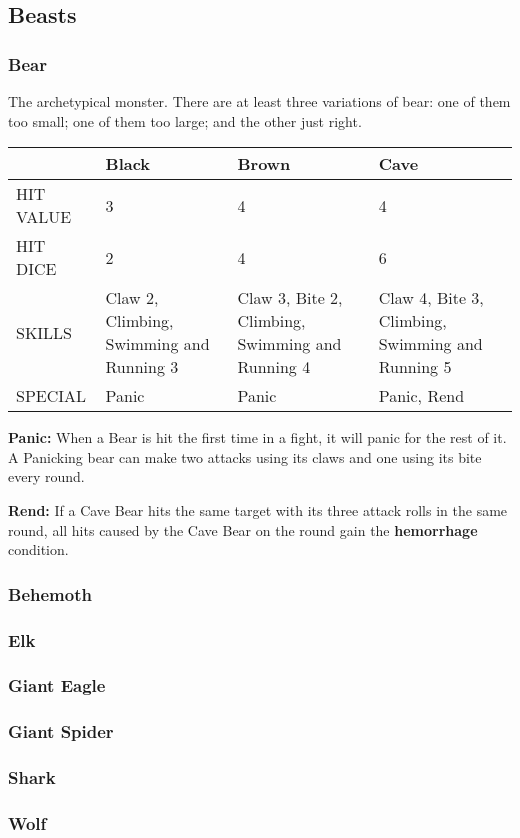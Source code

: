 \subsection{Beasts}
\begin{multicols}{2}
    \subsubsection*{Bear}\label{foe:bear}
    The archetypical monster. There are at least three variations of bear: one of them too small; one of them too large; and the other just right.
    \begin{tabularx}{\columnwidth}{|X|X|X|X|}
        \hline
        & Black & Brown & Cave \\
        \hline
        HIT VALUE & 3 & 4 & 4 \\
        \hline
        HIT DICE & 2 & 4 & 6 \\
        \hline
        SKILLS & Claw 2, Climbing, Swimming and Running 3 & Claw 3, Bite 2, Climbing, Swimming and Running 4 & Claw 4, Bite 3, Climbing, Swimming and Running 5 \\
        \hline
        SPECIAL & Panic & Panic & Panic, Rend \\
        \hline
    \end{tabularx}

    \textbf{Panic:} When a Bear is hit the first time in a fight, it will panic for the rest of it. A Panicking bear can make two attacks using its claws and one using its bite every round.
    
    \textbf{Rend:} If a Cave Bear hits the same target with its three attack rolls in the same round, all hits caused by the Cave Bear on the round gain the \textbf{hemorrhage} condition.
    \subsubsection*{Behemoth}\label{foe:behemoth}
    \subsubsection*{Elk}\label{foe:elk}
    \subsubsection*{Giant Eagle}\label{foe:giant-eagle}
    \subsubsection*{Giant Spider}\label{foe:giant-spider}
    \subsubsection*{Shark}\label{foe:shark}
    \subsubsection*{Wolf}\label{foe:wolf}
\end{multicols}

